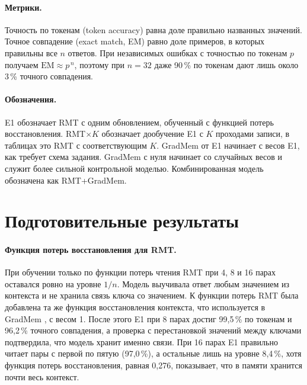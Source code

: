 \documentclass[a4paper,11pt]{article}
\begin{document}
\paragraph{Метрики.} Точность по токенам (token accuracy) равна доле правильно названных значений. Точное совпадение (exact match, EM) равно доле примеров, в которых правильны все $n$ ответов. При независимых ошибках с точностью по токенам $p$ получаем $\mathrm{EM}\approx p^{\,n}$, поэтому при $n=32$ даже 90\,\% по токенам дают лишь около 3\,\% точного совпадения.
\paragraph{Обозначения.} E1 обозначает RMT с одним обновлением, обученный с функцией потерь восстановления. RMT$\times K$ обозначает дообучение E1 с $K$ проходами записи, в таблицах это RMT с соответствующим $K$. GradMem от E1 начинает с весов E1, как требует схема задания. GradMem с нуля начинает со случайных весов и служит более сильной контрольной моделью. Комбинированная модель обозначена как RMT+GradMem.

\section{Подготовительные результаты}
\paragraph{Функция потерь восстановления для RMT.} При обучении только по функции потерь чтения RMT при 4, 8 и 16 парах оставался ровно на уровне $1/n$. Модель выучивала ответ любым значением из контекста и не хранила связь ключа со значением. К функции потерь RMT была добавлена та же функция восстановления контекста, что используется в GradMem \cite{gradmem}, с весом 1. После этого E1 при 8 парах достиг 99,5\,\% по токенам и 96,2\,\% точного совпадения, а проверка с перестановкой значений между ключами подтвердила, что модель хранит именно связи. При 16 парах E1 правильно читает пары с первой по пятую (97,0\,\%), а остальные лишь на уровне 8,4\,\%, хотя функция потерь восстановления, равная 0,276, показывает, что в памяти хранится почти весь контекст.
\end{document}
